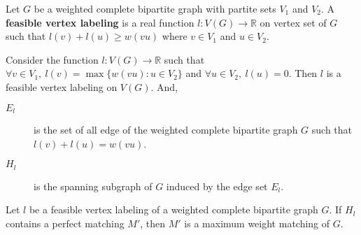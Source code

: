 \begin{definition}
	Let $G$ be a weighted complete bipartite graph with partite sets $V_1$ and $V_2$. A \textbf{feasible vertex labeling} is a real function $l : V(G) \to \mathbb{R}$ on vertex set of $G$ such that $l(v) + l(u) \ge w(vu)$ where $v \in V_1$ and $u \in V_2$.
\end{definition}

\begin{definition} Consider the function $l : V(G) \to \mathbb{R}$ such that \\
	$\forall v \in V_1,\ l(v) = \max \{ w(vu) : u \in V_2\}$ and $\forall u \in V_2,\ l(u) = 0$. Then $l$ is a feasible vertex labeling on $V(G)$. And,
	\begin{description}
		\item[$E_l$] is the set of all edge of the weighted complete bipartite graph $G$ such that $l(v)+l(u) = w(vu)$.
		\item[$H_l$] is the spanning subgraph of $G$ induced by the edge set $E_l$.
	\end{description}
\end{definition}

\begin{theorem}
	Let $l$ be a feasible vertex labeling of a weighted complete bipartite graph $G$. If $H_l$ contains a perfect matching $M'$, then $M'$ is a maximum weight matching of $G$.
\end{theorem}

